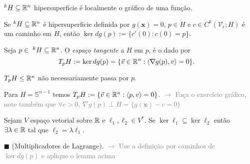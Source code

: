 \begin{corollary}
    \(^kH\subseteq \mathbb{R}^n\) hipersuperficie é localmente o gráfico de uma função.  
\end{corollary}


\begin{proposition}
    Se \(^k H\subseteq \mathbb{R}^n\) é hipersuperficie definida por \(g(\textbf{x})=0\), \(p\in H\) e \(c\in C^k(\mathcal{V}_\epsilon;H)\) é um caminho em \(H\), então \(\ker dg(p):= \{c{'}(0): c(0) = p \}\).
\end{proposition}


\begin{definition}
    Seja \(p \in \ ^k H\subseteq \mathbb{R}^n\). O \emph{espaço tangente} a \(H\) em \(p\), é o dado por   
    \[T_pH:= \ker dg(p) = \{\vec{v} \in \mathbb{R}^n: \langle \nabla g(p), v\rangle = 0\}. \]
\end{definition}
\begin{note}
    \(T_pH\leq \mathbb{R}^n\) não necessariamente passa por \(p\).
\end{note}

\begin{example}
    Para \(H = \mathbb{S}^{n-1}\) temos \(T_p H := \{\vec{v}\in \mathbb{R}^n : \langle p, v\rangle = 0\}\). \textcolor{gray}{\(\rightarrow\) Faça o exercício gráfico, note também que \(\forall c>0,\  \nabla g(p) \perp H = \{g(\textbf{x})-c=0\}\)}
\end{example}

\begin{lemma}
    Sejam \(V\) espaço vetorial sobre \(\mathbb{R}\) e \(\ell_1, \ell_2 \in V^{*}\). Se \(\ker \ell_1 \subseteq \ker \ell_2\) então \(\exists \lambda \in \mathbb{R} \) tal que \(\ell_2 = \lambda \ell_1 \). 
\end{lemma}
\begin{corollary}
    \(\blacksquare\) (Multiplicadores de Lagrange). \textcolor{gray}{\(\rightarrow\) Use a definição por caminhos de \(\ker dg(p)\) e aplique o lemma acima}
\end{corollary}

